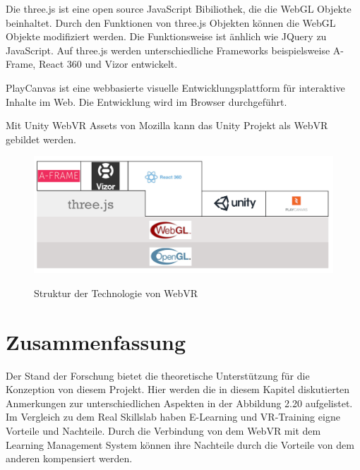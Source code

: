  Die three.js ist eine open source JavaScript Bibiliothek, die die WebGL Objekte beinhaltet. Durch den Funktionen von three.js Objekten können die WebGL Objekte modifiziert werden. Die Funktionsweise ist änhlich wie JQuery zu JavaScript. Auf three.js werden unterschiedliche Frameworks beispielsweise A-Frame, React 360 und Vizor entwickelt.
 
 PlayCanvas ist eine webbasierte visuelle Entwicklungsplattform für interaktive Inhalte im Web. Die Entwicklung wird im Browser durchgeführt.
 
 Mit Unity WebVR Assets von Mozilla kann das Unity Projekt als WebVR gebildet werden.

\begin{figure}[ht]
\vspace*{1em}
\centering
\caption{Struktur der Technologie von WebVR}
\includegraphics[width=\textwidth]{images/webVRStruckture.png}
\label{fig:webVRStruckture} 
\end{figure}

\section{Zusammenfassung}
Der Stand der Forschung bietet die theoretische Unterstützung für die Konzeption von diesem Projekt. Hier werden die in diesem Kapitel diskutierten Anmerkungen zur unterschiedlichen Aspekten in der Abbildung 2.20 aufgelistet. Im Vergleich zu dem Real Skillslab haben E-Learning und VR-Training eigne Vorteile und Nachteile. Durch die Verbindung von dem  WebVR mit dem Learning Management System können ihre Nachteile durch die Vorteile von dem anderen kompensiert werden.

